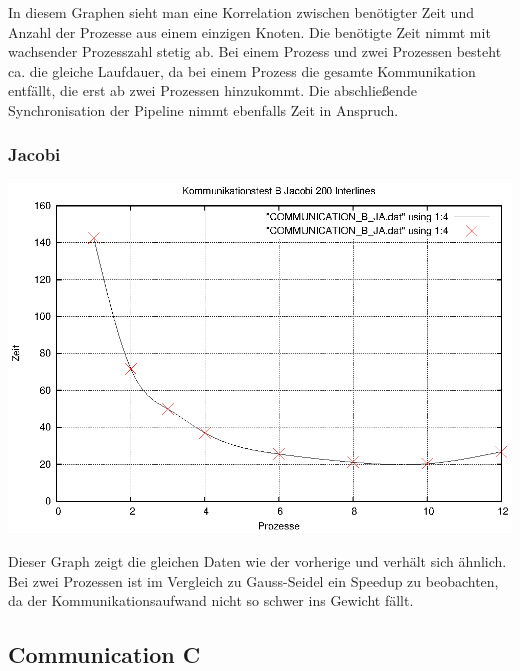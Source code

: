 \documentclass[a4paper,12pt]{scrartcl}
\begin{document}
In diesem Graphen sieht man eine Korrelation zwischen benötigter Zeit
und Anzahl der Prozesse aus einem einzigen Knoten. Die benötigte Zeit
nimmt mit wachsender Prozesszahl stetig ab. Bei einem Prozess und zwei
Prozessen besteht ca. die gleiche Laufdauer, da bei einem Prozess die
gesamte Kommunikation entfällt, die erst ab zwei Prozessen hinzukommt.
Die abschließende Synchronisation der Pipeline nimmt ebenfalls Zeit in
Anspruch.

\newpage

\subsubsection{Jacobi}
\begin{multicols}{2}
\includegraphics[scale=0.5]{results/COMMUNICATION_B_JA.eps}

\end{multicols}

Dieser Graph zeigt die gleichen Daten wie der vorherige und verhält sich
ähnlich. Bei zwei Prozessen ist im Vergleich zu Gauss-Seidel ein Speedup
zu beobachten, da der Kommunikationsaufwand nicht so schwer ins Gewicht fällt.

\newpage

\subsection{Communication C}
\end{document}
